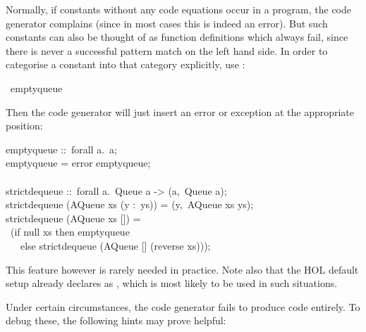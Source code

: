 \begin{isabellebody}
\begin{isamarkuptext}
  Normally, if constants without any code equations occur in a
  program, the code generator complains (since in most cases this is
  indeed an error).  But such constants can also be thought
  of as function definitions which always fail,
  since there is never a successful pattern match on the left hand
  side.  In order to categorise a constant into that category
  explicitly, use \hypertarget{command.code-abort}{\hyperlink{command.code-abort}{\mbox{}}}:%
\end{isamarkuptext}%
\isamarkuptrue%
%
\isadelimquote
%
\endisadelimquote
%
\isatagquote
{}\isamarkupfalse%
\ empty{\isacharunderscore}queue%
\endisatagquote
{\isafoldquote}%
%
\isadelimquote
%
\endisadelimquote
%
\begin{isamarkuptext}%
\noindent Then the code generator will just insert an error or
  exception at the appropriate position:%
\end{isamarkuptext}%
\isamarkuptrue%
%
\isadelimquote
%
\endisadelimquote
%
\isatagquote
%
\begin{isamarkuptext}%
\isatypewriter%
\noindent%
\hspace*{0pt}empty{}queue ::~forall a.~a;\\
\hspace*{0pt}empty{}queue = error {}empty{}queue{};\\
\hspace*{0pt}\\
\hspace*{0pt}strict{}dequeue ::~forall a.~Queue a -> (a,~Queue a);\\
\hspace*{0pt}strict{}dequeue (AQueue xs (y :~ys)) = (y,~AQueue xs ys);\\
\hspace*{0pt}strict{}dequeue (AQueue xs []) =\\
\hspace*{0pt} ~(if null xs then empty{}queue\\
\hspace*{0pt} ~~~else strict{}dequeue (AQueue [] (reverse xs)));%
\end{isamarkuptext}%
\isamarkuptrue%
%
\endisatagquote
{\isafoldquote}%
%
\isadelimquote
%
\endisadelimquote
%
\begin{isamarkuptext}%
\noindent This feature however is rarely needed in practice.  Note
  also that the HOL default setup already declares 
  as \hyperlink{command.code-abort}{\mbox{}}, which is most likely to be used in such
  situations.%
\end{isamarkuptext}%
\isamarkuptrue%
%
\isamarkuptrue%
%
\begin{isamarkuptext}%
Under certain circumstances, the code generator fails to produce
  code entirely.  To debug these, the following hints may prove
  helpful:


\end{isamarkuptext}
\end{isabellebody}

